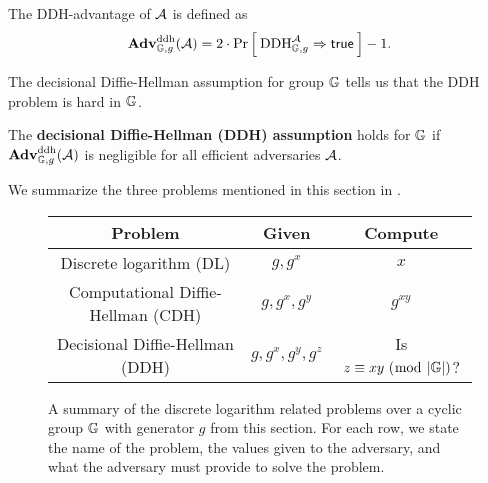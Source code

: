 \begin{center}

\end{center}

The DDH-advantage of ${\mathcal A}$ is defined as 
\begin{equation*}
\mathbf{Adv}^{\mathrm{ddh}}_{\mathbb{G}, g}({\mathcal A}) = 2 \cdot \Pr\left[\: \textnormal{DDH}_{\mathbb{G}, g}^{\mathcal A}\Rightarrow\mathsf{true} \:\right] - 1.
\end{equation*}

The decisional Diffie-Hellman assumption for group $\mathbb{G}$ tells us that the DDH problem is hard in $\mathbb{G}$. 

\begin{definition}
	The \textbf{decisional Diffie-Hellman (DDH) assumption} holds for $\mathbb{G}$ if $\mathbf{Adv}^{\mathrm{ddh}}_{\mathbb{G}, g}({\mathcal A})$ is negligible for all efficient adversaries ${\mathcal A}$.
\end{definition}

We summarize the three problems mentioned in this section in . 

\begin{figure}[H]
	\center
	\begin{tabular}{|c|c|c|}
		\hline
		Problem & Given & Compute \\
		\hline \hline
		Discrete logarithm (DL) & $g, g^x$ & $x$ \\
		\hline
		Computational Diffie-Hellman (CDH) & $g,g^x,g^y$ & $g^{xy}$ \\
		\hline
		Decisional Diffie-Hellman (DDH) & $g, g^x, g^y, g^z$ & Is $z \equiv xy\ (\bmod \ |\mathbb{G}|)$? \\
		\hline
	\end{tabular}
	\caption{A summary of the discrete logarithm related problems over a cyclic group $\mathbb{G}$ with generator $g$ from this section. For each row, we state the name of the problem, the values given to the adversary, and what the adversary must provide to solve the problem.}
	\label{fig:DL}
\end{figure}

